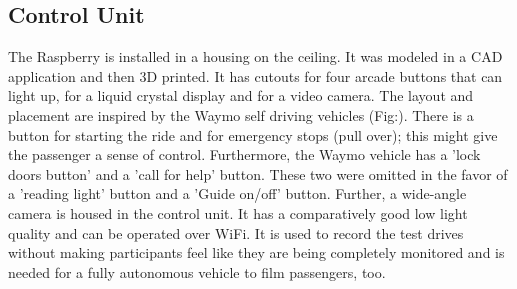 \subsection{Control Unit}
\label{ssec:controlunit}
The Raspberry is installed in a housing on the ceiling. It was modeled in a CAD application and then 3D printed. It has cutouts for four arcade buttons that can light up, for a liquid crystal display and for a video camera. The layout and placement are inspired by the Waymo self driving vehicles (Fig:\emph{}). There is a button for starting the ride and for emergency stops (pull over); this might give the passenger a sense of control. Furthermore, the Waymo vehicle has a 'lock doors button' and a 'call for help' button. These two were omitted in the favor of a 'reading light' button and a 'Guide on/off' button. Further, a wide-angle camera is housed in the control unit. It has a comparatively good low light quality and can be operated over WiFi. It is used to record the test drives without making participants feel like they are being completely monitored and is needed for a fully autonomous vehicle to film passengers, too. 

